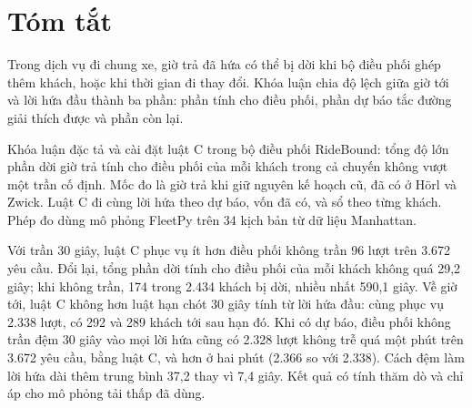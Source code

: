 \chapter*{Tóm tắt}

Trong dịch vụ đi chung xe, giờ trả đã hứa có thể bị dời khi bộ điều phối ghép thêm khách, hoặc khi thời gian đi
thay đổi. Khóa luận chia độ lệch giữa giờ tới và lời hứa đầu thành ba phần: phần tính cho điều phối, phần dự báo
tắc đường giải thích được và phần còn lại.

Khóa luận đặc tả và cài đặt luật C trong bộ điều phối RideBound: tổng độ lớn phần dời giờ trả tính cho điều phối
của mỗi khách trong cả chuyến không vượt một trần cố định. Mốc đo là giờ trả khi giữ nguyên kế hoạch cũ, đã có ở
Hörl và Zwick. Luật C đi cùng lời hứa theo dự báo, vốn đã có, và sổ theo từng khách. Phép đo dùng mô phỏng FleetPy
trên 34 kịch bản từ dữ liệu Manhattan.

Với trần 30 giây, luật C phục vụ ít hơn điều phối không trần 96 lượt trên 3.672 yêu cầu. Đổi lại, tổng phần dời
tính cho điều phối của mỗi khách không quá 29,2 giây; khi không trần, 174 trong 2.434 khách bị dời, nhiều nhất
590,1 giây. Về giờ tới, luật C không hơn luật hạn chót 30 giây tính từ lời hứa đầu: cùng phục vụ 2.338 lượt, có
292 và 289 khách tới sau hạn đó. Khi có dự báo, điều phối không trần đệm 30 giây vào mọi lời hứa cũng có 2.328 lượt
không trễ quá một phút trên 3.672 yêu cầu, bằng luật C, và hơn ở hai phút (2.366 so với 2.338). Cách đệm làm lời
hứa dài thêm trung bình 37,2 thay vì 7,4 giây. Kết quả có tính thăm dò và chỉ áp cho mô phỏng tải thấp đã dùng.

